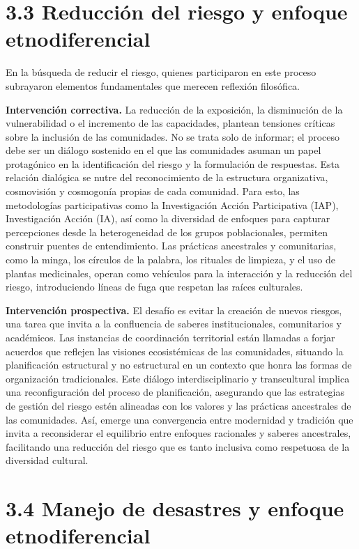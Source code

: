 \documentclass[
  spanish,
  letterpaper,
]{book}
\begin{document}
\section{3.3 Reducción del riesgo y enfoque
etnodiferencial}\label{reducciuxf3n-del-riesgo-y-enfoque-etnodiferencial}

En la búsqueda de reducir el riesgo, quienes participaron en este
proceso subrayaron elementos fundamentales que merecen reflexión
filosófica.

\textbf{Intervención correctiva.} La reducción de la exposición, la
disminución de la vulnerabilidad o el incremento de las capacidades,
plantean tensiones críticas sobre la inclusión de las comunidades. No se
trata solo de informar; el proceso debe ser un diálogo sostenido en el
que las comunidades asuman un papel protagónico en la identificación del
riesgo y la formulación de respuestas. Esta relación dialógica se nutre
del reconocimiento de la estructura organizativa, cosmovisión y
cosmogonía propias de cada comunidad. Para esto, las metodologías
participativas como la Investigación Acción Participativa (IAP),
Investigación Acción (IA), así como la diversidad de enfoques para
capturar percepciones desde la heterogeneidad de los grupos
poblacionales, permiten construir puentes de entendimiento. Las
prácticas ancestrales y comunitarias, como la minga, los círculos de la
palabra, los rituales de limpieza, y el uso de plantas medicinales,
operan como vehículos para la interacción y la reducción del riesgo,
introduciendo líneas de fuga que respetan las raíces culturales.

\textbf{Intervención prospectiva.} El desafío es evitar la creación de
nuevos riesgos, una tarea que invita a la confluencia de saberes
institucionales, comunitarios y académicos. Las instancias de
coordinación territorial están llamadas a forjar acuerdos que reflejen
las visiones ecosistémicas de las comunidades, situando la planificación
estructural y no estructural en un contexto que honra las formas de
organización tradicionales. Este diálogo interdisciplinario y
transcultural implica una reconfiguración del proceso de planificación,
asegurando que las estrategias de gestión del riesgo estén alineadas con
los valores y las prácticas ancestrales de las comunidades. Así, emerge
una convergencia entre modernidad y tradición que invita a reconsiderar
el equilibrio entre enfoques racionales y saberes ancestrales,
facilitando una reducción del riesgo que es tanto inclusiva como
respetuosa de la diversidad cultural.

\section{3.4 Manejo de desastres y enfoque
etnodiferencial}\label{manejo-de-desastres-y-enfoque-etnodiferencial}
\end{document}
